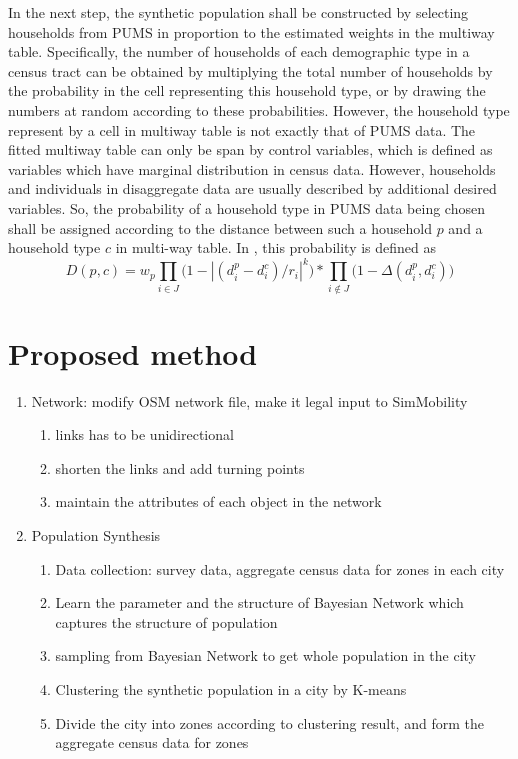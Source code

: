 \documentclass{article}
\begin{document}
In the next step, the synthetic population shall be constructed by selecting households from PUMS in proportion to the estimated weights in the multiway table.
Specifically, the number of households of each demographic type in a census tract can be obtained by multiplying the total number of households by the probability in the cell representing this household type, or by drawing the numbers at random according to these probabilities.
However, the household type represent by a cell in multiway table is not exactly that of PUMS data.
The fitted multiway table can only be span by control variables, which is defined as variables which have marginal distribution in census data.
However, households and individuals in disaggregate data are usually described by additional desired variables.
So, the probability of a household type in PUMS data being chosen shall be assigned according to the distance between such a household $p$ and a household type $c$ in multi-way table.
In \cite{beckman1996creating}, this probability is defined as 
\begin{equation}
	D(p,c) = w_p \prod_{i \in J}\Big(1-|(d_i^p-d_i^c)/r_i|^k\Big)*\prod_{i \notin J}\Big(1-\Delta(d_i^p, d_i^c)\Big)
\end{equation}

\section{Proposed method}

\begin{enumerate}[Step 1:]
\item Network: modify OSM network file, make it legal input to SimMobility
  \begin{enumerate}[1.]
  \item links has to be unidirectional
  \item shorten the links and add turning points
  \item maintain the attributes of each object in the network
  \end{enumerate}
\item Population Synthesis
  \begin{enumerate}[1. ]
  \item Data collection: survey data, aggregate census data for zones in each city
  \item Learn the parameter and the structure of Bayesian Network which captures the structure of population
  \item sampling from Bayesian Network to get whole population in the city
  \item Clustering the synthetic population in a city by K-means
  \item Divide the city into zones according to clustering result, and form the aggregate census data for zones
  \end{enumerate} 
\end{enumerate}
\end{document}
